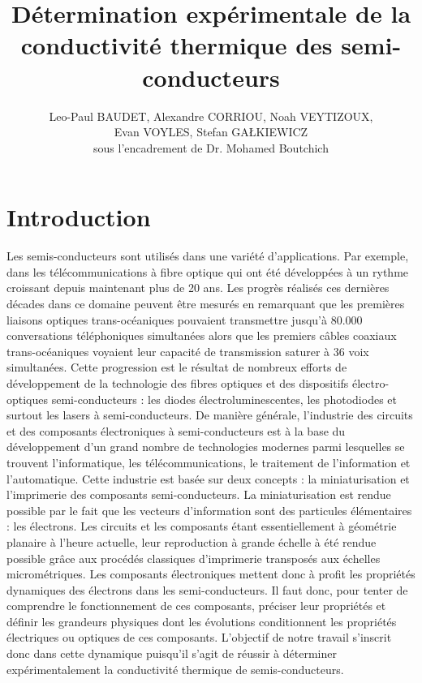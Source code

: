 \documentclass[10pt,a4paper]{report}
\begin{document}
\title{Détermination expérimentale de la conductivité thermique des semi-conducteurs}
\author{Leo-Paul BAUDET,  Alexandre CORRIOU, Noah VEYTIZOUX, \\Evan VOYLES, Stefan GA\L KIEWICZ \\sous l'encadrement de
Dr. Mohamed Boutchich}
\maketitle
\tableofcontents
\chapter{Introduction}
Les semis-conducteurs sont utilisés dans une variété d'applications. Par exemple, dans les télécommunications à fibre optique qui ont été développées à un rythme croissant depuis maintenant plus de 20 ans. Les progrès réalisés ces dernières décades dans ce domaine peuvent être mesurés en remarquant que les premières liaisons optiques trans-océaniques pouvaient transmettre jusqu'à 80.000 conversations téléphoniques simultanées alors que les premiers câbles coaxiaux trans-océaniques voyaient leur capacité de transmission saturer à 36 voix simultanées. Cette progression est le résultat de nombreux efforts de développement de la technologie des fibres optiques et des dispositifs électro-optiques semi-conducteurs : les diodes électroluminescentes, les photodiodes et surtout les lasers à semi-conducteurs. De manière générale, l’industrie des circuits et des composants électroniques à semi-conducteurs est à la base du développement d’un grand nombre de technologies modernes parmi lesquelles se trouvent l’informatique, les télécommunications, le traitement de l'information et l’automatique. Cette industrie est basée sur deux concepts : la miniaturisation et l'imprimerie des composants semi-conducteurs. La miniaturisation est rendue possible par le fait que les vecteurs d’information sont des particules élémentaires : les électrons. Les circuits et les composants étant essentiellement à géométrie planaire à l’heure actuelle, leur reproduction à grande échelle à été rendue possible grâce aux procédés classiques d’imprimerie transposés aux échelles micrométriques. Les composants électroniques mettent donc à profit les propriétés dynamiques des électrons dans les semi-conducteurs. Il faut donc, pour tenter de comprendre le fonctionnement de ces composants, préciser leur propriétés et définir les grandeurs physiques dont les évolutions conditionnent les propriétés électriques ou optiques de ces composants. L'objectif de notre travail s'inscrit donc dans cette dynamique puisqu'il s'agit de réussir à déterminer expérimentalement la conductivité thermique de semis-conducteurs.
\end{document}
